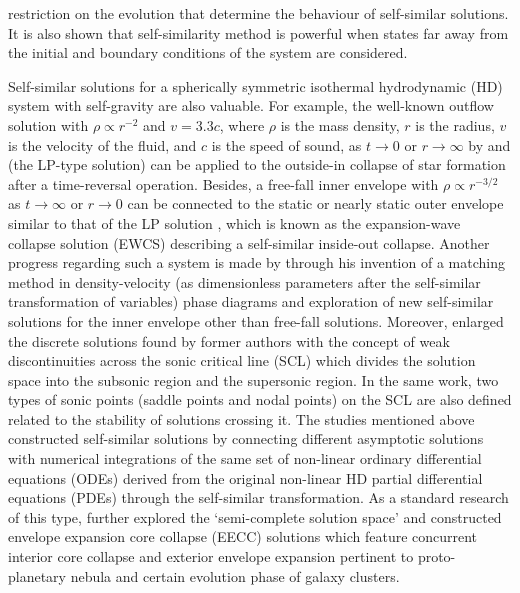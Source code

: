 \documentclass[fleqn,usenatbib]{mnras}
\begin{document}
restriction on the evolution that determine the behaviour of self-similar solutions. It is also shown that self-similarity method is powerful when states far away from the initial and boundary conditions of the system are considered.

Self-similar solutions for a spherically symmetric isothermal hydrodynamic (HD) system with self-gravity are also valuable. For example, the well-known outflow solution with $\rho\propto r^{-2}$ and $v=3.3c$, where $\rho$ is the mass density, $r$ is the radius, $v$ is the velocity of the fluid, and $c$ is the speed of sound, as $t\rightarrow 0$ or $r\rightarrow\infty$ by \citet{larson1969numerical} and \citet{penston1969dynamics} (the LP-type solution) can be applied to the outside-in collapse of star formation after a time-reversal operation. Besides, a free-fall inner envelope with $\rho\propto r^{-3/2}$ as $t\rightarrow\infty$ or $r\rightarrow 0$ can be connected to the static or nearly static outer envelope similar to that of the LP solution \citep{shu1977self}, which is known as the expansion-wave collapse solution (EWCS) describing a self-similar inside-out collapse. Another progress regarding such a system is made by \citet{hunter1977collapse} through his invention of a matching method in density-velocity (as dimensionless parameters after the self-similar transformation of variables) phase diagrams and exploration of new self-similar solutions for the inner envelope other than free-fall solutions. Moreover, \citet{whitworth1985self} enlarged the discrete solutions found by former authors with the concept of weak discontinuities across the sonic critical line (SCL) which divides the solution space into the subsonic region and the supersonic region. In the same work, two types of sonic points (saddle points and nodal points) on the SCL are also defined related to the stability of solutions crossing it. The studies mentioned above constructed self-similar solutions by connecting different asymptotic solutions with numerical integrations of the same set of non-linear ordinary differential equations (ODEs) derived from the original non-linear HD partial differential equations (PDEs) through the self-similar transformation. As a standard research of this type, \citet{lou2004envelope} further explored the `semi-complete solution space' and constructed envelope expansion core collapse (EECC) solutions which feature concurrent interior core collapse and exterior envelope expansion pertinent to proto-planetary nebula and certain evolution phase of galaxy clusters.
\end{document}
